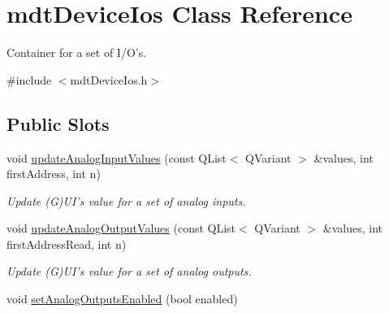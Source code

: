 \hypertarget{classmdt_device_ios}{
\section{mdtDeviceIos Class Reference}
\label{classmdt_device_ios}
}


Container for a set of I/O's.  




{\ttfamily \#include $<$mdtDeviceIos.h$>$}

\subsection*{Public Slots}
\begin{DoxyCompactItemize}
\item 
void \hyperlink{classmdt_device_ios_ab1a738a2305998aa0c8966d092db1c40}{updateAnalogInputValues} (const QList$<$ QVariant $>$ \&values, int firstAddress, int n)
\begin{DoxyCompactList}\small\item\em Update (G)UI's value for a set of analog inputs. \end{DoxyCompactList}\item 
void \hyperlink{classmdt_device_ios_a750075dc8a318e8a6feea2e0720e5586}{updateAnalogOutputValues} (const QList$<$ QVariant $>$ \&values, int firstAddressRead, int n)
\begin{DoxyCompactList}\small\item\em Update (G)UI's value for a set of analog outputs. \end{DoxyCompactList}\item 
\hypertarget{classmdt_device_ios_ae266924a427fbc896e5f9774890ec91f}{
void \hyperlink{classmdt_device_ios_ae266924a427fbc896e5f9774890ec91f}{setAnalogOutputsEnabled} (bool enabled)}
\label{classmdt_device_ios_ae266924a427fbc896e5f9774890ec91f}


\end{DoxyCompactItemize}

